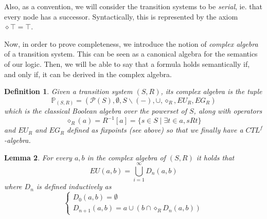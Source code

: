 \documentclass[11pt]{article}
\newtheorem{definition}{Definition}[section]
\newtheorem{lemma}[definition]{Lemma}
\begin{document}
Also, as a convention, we will consider the transition systems to be \emph{serial}, ie. that every node has a successor. Syntactically, this is represented by the axiom $\diamond\top = \top$.

Now, in order to prove completeness, we introduce the notion of \emph{complex algebra} of a transition system. This can be seen as a canonical algebra for the semantics of our logic. Then, we will be able to say that a formula holds semantically if, and only if, it can be derived in the complex algebra.

\begin{definition}\label{complex_algebra}
    Given a transition system $(S,R)$, its \emph{complex algebra} is the tuple $$\mathbb{P}_{(S,R)}=(\mathcal{P}(S),\emptyset,S\backslash(-),\cup,\diamond_R,EU_R,EG_R)$$ which is the classical Boolean algebra over the powerset of $S$, along with operators $$\diamond_R(a)=R^{-1}[a]=\{s\in S \mid \exists t\in a, sRt \}$$ and $EU_R$ and $EG_R$ defined as fixpoints (see above) so that we finally have a $CTL^f$-algebra. 
\end{definition}

\begin{lemma}\label{EU_as_union}
        For every $a,b$ in the complex algebra of $(S,R)$ it holds that $$EU(a,b)=\bigcup_{i=1}^{\infty}D_n(a,b)$$ where $D_n$ is defined inductively as
        \begin{equation*}
            \begin{cases}
                D_0(a,b)=\emptyset\\
                D_{n+1}(a,b)=a\cup(b\cap\diamond_R D_n(a,b))
            \end{cases}
        \end{equation*}
        
\end{lemma}
\end{document}
